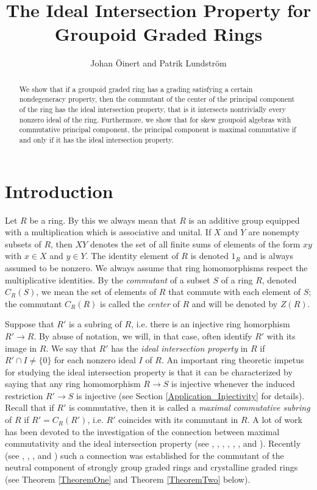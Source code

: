 \documentclass[11pt,leqno]{amsart}
\title{The Ideal Intersection Property for Groupoid Graded Rings}
\date{}
\author{Johan \"{O}inert and Patrik Lundstr\"{o}m}
\theoremstyle{plain}
\theoremstyle{definition}
\begin{document}
\maketitle

\begin{abstract}
We show that if a groupoid graded ring has
a grading satis\-fying a certain nondegeneracy property,
then the commutant of the center of the principal component of the ring
has the ideal intersection property, that is it
intersects nontrivially every nonzero ideal of the ring.
Furthermore, we show that for skew groupoid algebras with
commutative principal component, the principal component
is maximal commutative if and only if it has the
ideal intersection property.
\end{abstract}



\section{Introduction}


Let $R$ be a ring.
By this we always mean that $R$ is an additive group
equipped with a multiplication which is associative and unital.
If $X$ and $Y$ are nonempty subsets of $R$,
then $XY$ denotes the set of all finite sums of
elements of the form $xy$ with $x \in X$ and $y \in Y$.
The identity element of $R$ is denoted $1_R$ and
is always assumed to be nonzero.
We always assume that ring homomorphisms respect the multiplicative identities.
By the \emph{commutant}
of a subset $S$ of a ring $R$, denoted $C_R(S)$, we mean the set of elements
of $R$ that commute with each element of $S$;
the commutant $C_R(R)$ is called the \emph{center} of $R$ and will be denoted by $Z(R)$.

Suppose that $R'$ is a subring of $R$, i.e.
there is an injective ring homorphism  $R' \rightarrow R$.
By abuse of notation, we will, in that case,
often identify $R'$ with its image in $R$.
We say that $R'$ has the \emph{ideal intersection
property} in $R$ if $R' \cap I \neq \{ 0 \}$
for each nonzero ideal $I$ of $R$.
An important ring theoretic impetus for studying the ideal intersection
property is that it can be characterized
by saying that any ring homomorphism
$R \rightarrow S$ is injective whenever the
induced restriction $R' \rightarrow S$ is injective (see Section \ref{Application_Injectivity} for details).
Recall that if $R'$ is commutative, then it
is called a \emph{maximal commutative subring} of $R$
if $R'=C_R(R')$, i.e. $R'$ coincides with its commutant in $R$.
A lot of work has been devoted to the investigation of the
connection between maxi\-mal commutativity
and the ideal intersection property
(see \cite{coh}, \cite{fis}, \cite{for78}, \cite{lor},
\cite{lor79}, \cite{lor80}, \cite{mon78} and \cite{pas77}).
Recently (see \cite{oin06}, \cite{oin07}, \cite{oin08},
\cite{oin10} and \cite{oin09})
such a connection was established for the commutant
of the neutral component of strongly group graded rings
and crystalline graded rings
(see Theorem \ref{TheoremOne} and Theorem \ref{TheoremTwo} below).
\end{document}
